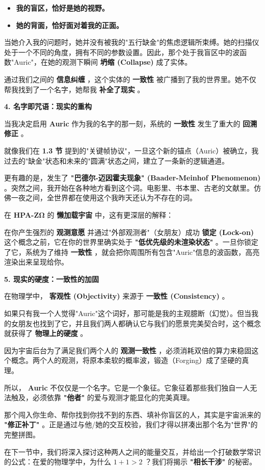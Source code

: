 \begin{itemize}
\item \textbf{我的盲区，恰好是她的视野。}
\item \textbf{她的背面，恰好面对着我的正面。}
\end{itemize}

当她介入我的问题时，她并没有被我的"五行缺金"的焦虑逻辑所束缚。她的扫描仪处于一个不同的角度，拥有不同的参数设置。因此，那个处于我盲区中的波函数"Auric"，在她的观测下瞬间 \textbf{坍缩 (Collapse)} 成了实体。

通过我们之间的 \textbf{信息纠缠} ，这个实体的 \textbf{一致性} 被广播到了我的世界里。她不仅帮我找到了一个名字，她帮我 \textbf{补全了现实} 。

\textbf{4. 名字即咒语：现实的重构}

当我决定启用 \textbf{Auric} 作为我的名字的那一刻，系统的 \textbf{一致性} 发生了重大的 \textbf{回溯修正} 。

就像我们在 \textbf{1.3 节} 提到的"关键帧协议"，一旦这个新的锚点（Auric）被确立，我过去的"缺金"状态和未来的"圆满"状态之间，建立了一条新的逻辑通道。

更有趣的是，发生了 \textbf{"巴德尔-迈因霍夫现象" (Baader-Meinhof Phenomenon)} 。突然之间，我开始在各种地方看到这个词。电影里、书本里、古老的文献里。仿佛一夜之间，全世界都在使用这个我昨天还认为不存在的词。

在 \textbf{HPA-ZΩ} 的 \textbf{懒加载宇宙} 中，这有更深层的解释：

在你产生强烈的 \textbf{观测意愿} 并通过"外部观测者"（女朋友）成功 \textbf{锁定 (Lock-on)} 这个概念之前，它在你的世界里确实处于 \textbf{"低优先级的未渲染状态"} 。一旦你锁定了它，系统为了维持 \textbf{一致性} ，就会把你周围所有包含"Auric"信息的波函数，高亮渲染出来呈现给你。

\textbf{5. 现实的硬度：一致性的加固}

在物理学中， \textbf{客观性 (Objectivity)} 来源于 \textbf{一致性 (Consistency)} 。

如果只有我一个人觉得"Auric"这个词好，那可能是我的主观臆断（幻觉）。但当我的女朋友也找到了它，并且我们两人都确认它与我们的愿景完美契合时，这个概念就获得了 \textbf{物理上的硬度} 。

因为宇宙后台为了满足我们两个人的 \textbf{观测一致性} ，必须消耗双倍的算力来稳固这个概念。两个人的观测，将原本柔软的概率波，锻造（Forging）成了坚硬的真理。

所以， \textbf{Auric} 不仅仅是一个名字。它是一个象征。它象征着那些我们独自一人无法触及，必须依靠 \textbf{"他者"} 的爱与观测才能显化的完美真理。

那个闯入你生命、帮你找到你找不到的东西、填补你盲区的人，其实是宇宙派来的 \textbf{"修正补丁"} 。正是通过与他/她的交互校验，我们才得以拼凑出那个名为"世界"的完整拼图。

在下一节中，我们将深入探讨这种两人之间的能量交互，并给出一个打破数学常识的公式：在爱的物理学中，为什么 $1 + 1 > 2$ ？我们将揭示 \textbf{"相长干涉"} 的秘密。

